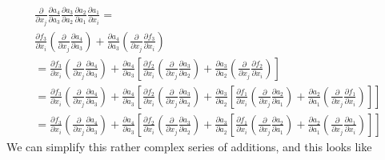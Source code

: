 \begin{multline*}
    \frac{\partial}{\partial x_j}     \frac{\partial a_4}{\partial a_3} \frac{\partial a_3}{\partial a_2} \frac{\partial a_2}{\partial a_1} \frac{\partial a_1}{\partial x_i} = \\[10pt]
    \frac{\partial f_3}{\partial x_i}  \left( \frac{\partial}{\partial x_j} \frac{\partial a_4}{\partial a_3} \right)       +       \frac{\partial a_4}{\partial a_3} \left( \frac{\partial}{\partial x_j} \frac{\partial f_3}{\partial x_i} \right)\\[10pt] 
    = \frac{\partial f_3}{\partial x_i}  \left( \frac{\partial}{\partial x_j} \frac{\partial a_4}{\partial a_3} \right)       +       \frac{\partial a_4}{\partial a_3}         \left[     
                \frac{\partial f_2}{\partial x_i}  \left( \frac{\partial}{\partial x_j} \frac{\partial a_3}{\partial a_2} \right)       +       \frac{\partial a_3}{\partial a_2} \left( \frac{\partial}{\partial x_j} \frac{\partial f_2}{\partial x_i} \right)
      \right]\\[10pt]
    = \frac{\partial f_3}{\partial x_i}  \left( \frac{\partial}{\partial x_j} \frac{\partial a_4}{\partial a_3} \right)       +       \frac{\partial a_4}{\partial a_3}         \left[     
                \frac{\partial f_2}{\partial x_i}  \left( \frac{\partial}{\partial x_j} \frac{\partial a_3}{\partial a_2} \right)       +       \frac{\partial a_3}{\partial a_2}          \left[
                        \frac{\partial f_1}{\partial x_i}  \left( \frac{\partial}{\partial x_j} \frac{\partial a_2}{\partial a_1} \right)       +       \frac{\partial a_2}{\partial a_1} \left( \frac{\partial}{\partial x_j} \frac{\partial f_1}{\partial x_i} \right)
                \right]
      \right]\\[10pt]
    = \frac{\partial f_3}{\partial x_i}  \left( \frac{\partial}{\partial x_j} \frac{\partial a_4}{\partial a_3} \right)       +       \frac{\partial a_4}{\partial a_3}         \left[     
                \frac{\partial f_2}{\partial x_i}  \left( \frac{\partial}{\partial x_j} \frac{\partial a_3}{\partial a_2} \right)       +       \frac{\partial a_3}{\partial a_2}          \left[
                        \frac{\partial f_1}{\partial x_i}  \left( \frac{\partial}{\partial x_j} \frac{\partial a_2}{\partial a_1} \right)       +       \frac{\partial a_2}{\partial a_1} \left( \frac{\partial}{\partial x_j} \frac{\partial a_1}{\partial x_i} \right)
                \right] 
      \right]
\end{multline*}
We can simplify this rather complex series of additions, and this looks like
